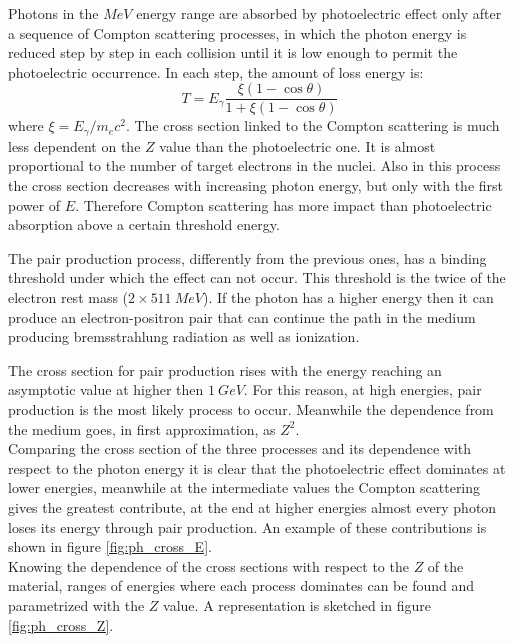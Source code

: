 
Photons in the $MeV$ energy range are absorbed by photoelectric effect only after a sequence of Compton scattering processes, in which the photon energy is reduced step by step in each collision until it is low enough to permit the photoelectric occurrence. In each step, the amount of loss energy is:
\begin{equation}
    T = E_{\gamma}\frac{\xi(1 - \cos{\theta})}{1 + \xi(1 - \cos{\theta})}
\end{equation}
where $\xi = E_{\gamma}/m_ec^2$.
The cross section linked to the Compton scattering is much less dependent on the $Z$ value than the photoelectric one. It is almost proportional to the number of target electrons in the nuclei. Also in this process the cross section decreases with increasing photon energy, but only with the first power of $E$. Therefore Compton scattering has more impact than photoelectric absorption above a certain threshold energy. %

The pair production process, differently from the previous ones, has a binding threshold under which the effect can not occur. This threshold is the twice of the electron rest mass ($2\times 511\ MeV$). If the photon has a higher energy then it can produce an electron-positron pair that can continue the path in the medium producing bremsstrahlung radiation as well as ionization.

The cross section for pair production rises with the energy reaching an asymptotic value at higher then $1\ GeV$. For this reason, at high energies, pair production is the most likely process to occur. Meanwhile the dependence from the medium goes, in first approximation, as $Z^2$.\\

Comparing the cross section of the three processes and its dependence with respect to the photon energy it is clear that the photoelectric effect dominates at lower energies, meanwhile at the intermediate values the Compton scattering gives the greatest contribute, at the end at higher energies almost every photon loses its energy through pair production. An example of these contributions is shown in figure \ref{fig:ph_cross_E}.\\
Knowing the dependence of the cross sections with respect to the $Z$ of the material, ranges of energies where each process dominates can be found and parametrized with the $Z$ value. A representation is sketched in figure \ref{fig:ph_cross_Z}.

